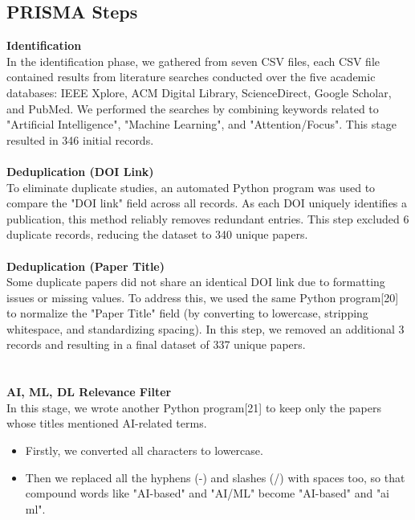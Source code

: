 \documentclass[12pt]{article}
\begin{document}
\subsection{PRISMA Steps}
\textbf{Identification} \\ 
In the identification phase, we gathered from seven CSV files, each CSV file contained results from literature searches conducted over the five academic databases: IEEE Xplore, ACM Digital Library, ScienceDirect, Google Scholar, and PubMed. We performed the searches by combining keywords related to "Artificial Intelligence", "Machine Learning", and "Attention/Focus". This stage resulted in 346 initial records. \\ \\
\textbf{Deduplication (DOI Link)} \\ 
To eliminate duplicate studies, an automated Python program was used to compare the "DOI link" field across all records. As each DOI uniquely identifies a publication, this method reliably removes redundant entries. This step excluded 6 duplicate records, reducing the dataset to 340 unique papers. \\ \\
\textbf{Deduplication (Paper Title)} \\ 
Some duplicate papers did not share an identical DOI link due to formatting issues or missing values. To address this, we used the same Python program[20] to normalize the "Paper Title" field (by converting to lowercase, stripping whitespace, and standardizing spacing). In this step, we removed an additional 3 records and resulting in a final dataset of 337 unique papers. \\ \\ \\
\textbf{AI, ML, DL Relevance Filter} \\ 
In this stage, we wrote another Python program[21] to keep only the papers whose titles mentioned AI-related terms. 
\begin{itemize}
    \item Firstly, we converted all characters to lowercase.
    \item Then we replaced all the hyphens (-) and slashes (/) with spaces too, so that compound words like "AI-based" and "AI/ML" become "AI-based" and "ai ml".
\end{itemize}
\end{document}

